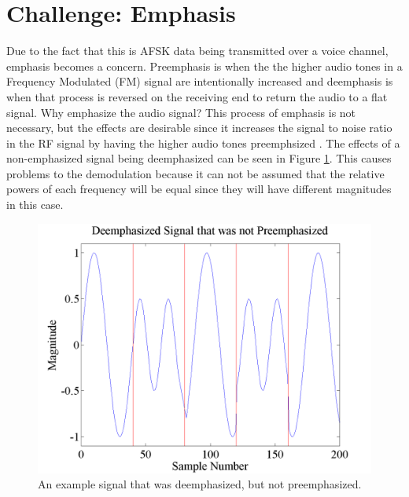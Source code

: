 \section{Challenge: Emphasis}
Due to the fact that this is AFSK data being transmitted over a voice channel, emphasis becomes a concern. Preemphasis is when the the higher audio tones in a Frequency Modulated (FM) signal are intentionally increased and deemphasis is when that process is reversed on the receiving end to return the audio to a flat signal. Why emphasize the audio signal? This process of emphasis is not necessary, but the effects are desirable since it increases the signal to noise ratio in the RF signal by having the higher audio tones preemphsized \cite{Gibilisco1994}. The effects of a non-emphasized signal being deemphasized can be seen in Figure \ref{emphasisExample}. This causes problems to the demodulation because it can not be assumed that the relative powers of each frequency will be equal since they will have different magnitudes in this case. 
\begin{figure}
  \centering
	\includegraphics[width=0.75\linewidth]{images/DeemphasizedSignalthatwasnotpreemphasized.png} 
	\caption{An example signal that was deemphasized, but not preemphasized.}
   \label{emphasisExample}
\end{figure}
